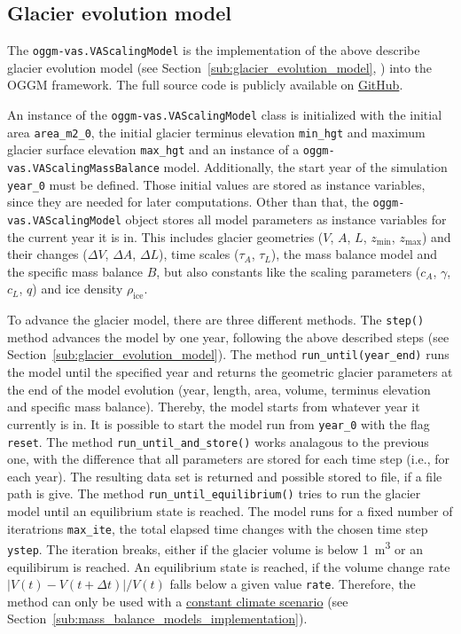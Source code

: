     \subsection{Glacier evolution model} %
    \label{sub:glacier_evolution_model_implementation}

        The \lstinline`oggm-vas.VAScalingModel` is the implementation of the above describe glacier evolution model (see Section~\ref{sub:glacier_evolution_model}, \citet[cf.]{Marzeion2012b}) into the OGGM framework. The full source code is publicly available on \href{https://github.com/OGGM/oggm-vas}{GitHub}.

        An instance of the \lstinline`oggm-vas.VAScalingModel` class is initialized with the initial area \lstinline`area_m2_0`, the initial glacier terminus elevation \lstinline`min_hgt` and maximum glacier surface elevation \lstinline`max_hgt` and an instance of a \lstinline`oggm-vas.VAScalingMassBalance` model. Additionally, the start year of the simulation \lstinline`year_0` must be defined. Those initial values are stored as instance variables, since they are needed for later computations. Other than that, the \lstinline`oggm-vas.VAScalingModel` object stores all model parameters as instance variables for the current year it is in. This includes glacier geometries ($V$, $A$, $L$, $z_\text{min}$, $z_\text{max}$) and their changes ($\Delta V$, $\Delta A$, $\Delta L$), time scales ($\tau_A$, $\tau_L$), the mass balance model and the specific mass balance $B$, but also constants like the scaling parameters ($c_A$, $\gamma$, $c_L$, $q$) and ice density $\rho_\text{ice}$.

        To advance the glacier model, there are three different methods. The \lstinline`step()` method advances the model by one year, following the above described steps (see Section~\ref{sub:glacier_evolution_model}). The method \lstinline`run_until(year_end)` runs the model until the specified year and returns the geometric glacier parameters at the end of the model evolution (year, length, area, volume, terminus elevation and specific mass balance). Thereby, the model starts from whatever year it currently is in. It is possible to start the model run from \lstinline`year_0` with the flag \lstinline`reset`. The method \lstinline`run_until_and_store()` works analagous to the previous one, with the difference that all parameters are stored for each time step (i.e., for each year). The resulting data set is returned and possible stored to file, if a file path is give. The method \lstinline`run_until_equilibrium()` tries to run the glacier model until an equilibrium state is reached. The model runs for a fixed number of iteratrions \lstinline`max_ite`, the total elapsed time changes with the chosen time step \lstinline`ystep`. The iteration breaks, either if the glacier volume is below \SI{1}{\cubic\meter} or an equilibirum is reached. An equilibrium state is reached, if the volume change rate $|V(t) - V(t+\Delta t)|/V(t)$ falls below a given value \lstinline`rate`. Therefore, the method can only be used with a \hyperref[ssub:constant_climate_scenario_implementation]{constant climate scenario} (see Section~\ref{sub:mass_balance_models_implementation}).
    
